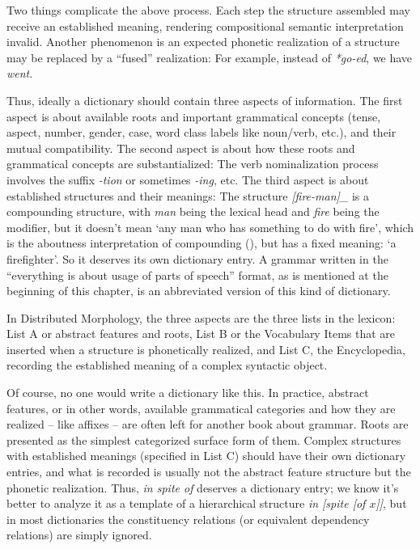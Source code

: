\documentclass[UTF8, a4paper, oneside, scheme=plain]{ctexrep}
\newcommand{\corpus}[1]{\emph{#1}}
\newcommand{\translate}[1]{`#1'}
\begin{document}
Two things complicate the above process. 
Each step the structure assembled may receive an established meaning,
rendering compositional semantic interpretation invalid.
Another phenomenon is 
an expected phonetic realization of a structure 
may be replaced by a ``fused'' realization:
For example, instead of \corpus{*go-ed}, we have \corpus{went}.

Thus, ideally a dictionary should contain three aspects of information.
The first aspect is about available roots and important grammatical concepts
(tense, aspect, number, gender, case, word class labels like noun/verb, etc.),
and their mutual compatibility.
The second aspect is about how these roots and grammatical concepts are substantialized:
The verb nominalization process involves the suffix \corpus{-tion} or sometimes \corpus{-ing}, etc.
The third aspect is about established structures and their meanings:
The structure \corpus{[fire-man]_{}} 
is a compounding structure,
with \corpus{man} being the lexical head and \corpus{fire} being the modifier,
but it doesn't mean \translate{any man who has something to do with fire},
which is the aboutness interpretation of compounding 
(),
but has a fixed meaning: \translate{a firefighter}.
So it deserves its own dictionary entry.
A grammar written in the ``everything is about usage of parts of speech'' format, 
as is mentioned at the beginning of this chapter,
is an abbreviated version of this kind of dictionary.

In Distributed Morphology,
the three aspects are the three lists in the lexicon:
List A or abstract features and roots,
List B or the Vocabulary Items that are inserted when a structure is phonetically realized,
and List C, the Encyclopedia, recording the established meaning of a complex syntactic object.

Of course, no one would write a dictionary like this.
In practice, abstract features,
or in other words,
available grammatical categories and how they are realized -- like affixes -- 
are often left for another book about grammar.
Roots are presented as the simplest categorized surface form of them.
Complex structures with established meanings (specified in List C) 
should have their own dictionary entries,
and what is recorded is usually not the abstract feature structure but the phonetic realization.
Thus, \corpus{in spite of} deserves a dictionary entry;
we know it's better to analyze it as a template of 
a hierarchical structure \corpus{in [spite [of $x$]]},
but in most dictionaries the constituency relations (or equivalent dependency relations)
are simply ignored.
\end{document}
